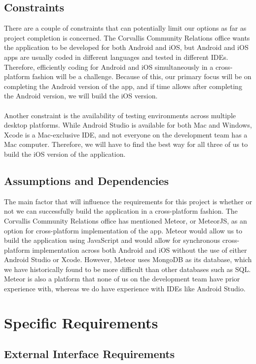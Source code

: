 \documentclass[draftclsnofoot, onecolumn, 10pt, compsoc]{IEEEtran}
\begin{document}
		\subsection{Constraints}
			There are a couple of constraints that can potentially limit our options as far as project completion is concerned. The Corvallis Community Relations office wants the application to be developed for both Android and iOS, but Android and iOS apps are usually coded in different languages and tested in different IDEs. Therefore, efficiently coding for Android and iOS simultaneously in a cross-platform fashion will be a challenge. Because of this, our primary focus will be on completing the Android version of the app, and if time allows after completing the Android version, we will build the iOS version. \\ \\
			Another constraint is the availability of testing environments across multiple desktop platforms. While Android Studio is available for both Mac and Windows, Xcode is a Mac-exclusive IDE, and not everyone on the development team has a Mac computer. Therefore, we will have to find the best way for all three of us to build the iOS version of the application.

		\subsection{Assumptions and Dependencies}
			The main factor that will influence the requirements for this project is whether or not we can successfully build the application in a cross-platform fashion. The Corvallis Community Relations office has mentioned Meteor, or MeteorJS, as an option for cross-platform implementation of the app. Meteor would allow us to build the application using JavaScript and would allow for synchronous cross-platform implementation across both Android and iOS without the use of either Android Studio or Xcode. However, Meteor uses MongoDB as its database, which we have historically found to be more difficult than other databases such as SQL. Meteor is also a platform that none of us on the development team have prior experience with, whereas we do have experience with IDEs like Android Studio.

	\section{Specific Requirements}
		\subsection{External Interface Requirements}
\end{document}
